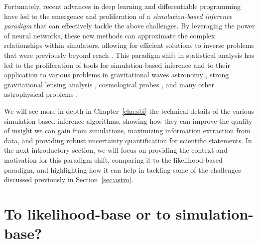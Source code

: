 Fortunately, recent advances in deep learning \cite{lecun2015deep} and differentiable programming \cite{baydin2018automatic} have led to the emergence and proliferation of a \emph{simulation-based inference paradigm} that can effectively tackle the above challenges. By leveraging the power of neural networks, these new methods can approximate the complex relationships within simulators, allowing for efficient solutions to inverse problems that were previously beyond reach \cite{Cranmer:2019eaq}. This paradigm shift in statistical analysis has led to the proliferation of tools for simulation-based inference \cite[\eg][]{Alsing:2019xrx, tejero-cantero2020sbi, Miller2022, lampe} and to their application to various problems in gravitational waves astronomy \cite[\eg][]{Dax:2021tsq, Crisostomi:2023tle, kolmus2024tuning, Dimitriou:2023knw, Vilchez:2024qnw, Bhardwaj:2023xph, Alvey:2023naa, Alvey:2023npw}, strong gravitational lensing analysis \cite[\eg][]{Montel:2022fhv, Wagner-Carena:2020yun, Wagner-Carena:2022mrn, wagnercarena2024strong, Coogan:2022cky, Brehmer:2019jyt, Zhang:2022djp}, cosmological probes \cite[\eg][]{List:2023aa, Tucci:2023bag, Alsing:2019xrx, Modi:2023drt, Makinen:2021nly, DES:2024xij, Jeffrey:2020aa, vonWietersheim-Kramsta:2024cks, Cole:2021gwr, FrancoAbellan:2024tbj, Saxena:2023tue, Karchev:2022xyn, Karchev:2024stw}, and many other astrophysical problems \cite[\eg][]{AnauMontel:2022ppb, Barret:2024kvc, vasist2023neural, Hahn:2022nda, khullar2022digs, Mishra-Sharma:2021oxe, Christy:2024hou, Hermans:2020skz, Alvey:2023pkx, Berteaud:2024zda, Mishra-Sharma:2021nhh}.

We will see more in depth in Chapter~\ref{cha:sbi} the technical details of the various simulation-based inference algorithms, showing how they can improve the quality of insight we can gain from simulations, maximizing information extraction from data, and providing robust uncertainty quantification for scientific statements. In the next introductory section, we will focus on providing the context and motivation for this paradigm shift, comparing it to the likelihood-based paradigm, and highlighting how it can help in tackling some of the challenges discussed previously in Section~\ref{sec:astro}.


\section{To likelihood-base or to simulation-base?}\label{sec:lbi-sbi}

